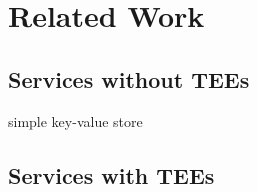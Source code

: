 \section{Related Work}
\subsection{Services without TEEs}
simple key-value store
\subsection{Services with TEEs}

